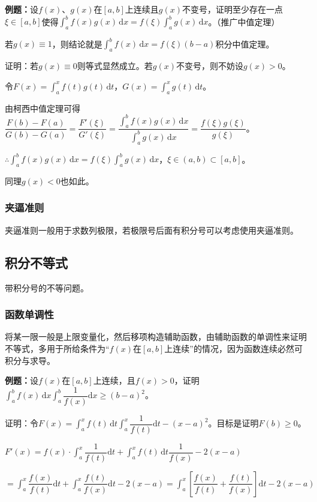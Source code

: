 \documentclass[UTF8, 12pt]{ctexart}
\begin{document}
\textbf{例题：}设$f(x)$、$g(x)$在$[a,b]$上连续且$g(x)$不变号，证明至少存在一点$\xi\in[a,b]$使得$\int_a^bf(x)g(x)\,\textrm{d}x=f(\xi)\int_a^bg(x)\,\textrm{d}x$。（推广中值定理）

若$g(x)\equiv1$，则结论就是$\int_a^bf(x)\,\textrm{d}x=f(\xi)(b-a)$积分中值定理。

证明：若$g(x)\equiv0$则等式显然成立。若$g(x)$不变号，则不妨设$g(x)>0$。

令$F(x)=\int_a^xf(t)g(t)\,\textrm{d}t$，$G(x)=\int_a^xg(t)\,\textrm{d}t$。

由柯西中值定理可得$\dfrac{F(b)-F(a)}{G(b)-G(a)}=\dfrac{F'(\xi)}{G'(\xi)}=\dfrac{\int_a^bf(x)g(x)\,\textrm{d}x}{\int_a^bg(x)\,\textrm{d}x}=\dfrac{f(\xi)g(\xi)}{g(\xi)}$。

$\therefore\int_a^bf(x)g(x)\,\textrm{d}x=f(\xi)\int_a^bg(x)\,\textrm{d}x$，$\xi\in(a,b)\subset[a,b]$。

同理$g(x)<0$也如此。

\subsubsection{夹逼准则}

夹逼准则一般用于求数列极限，若极限号后面有积分号可以考虑使用夹逼准则。

\subsection{积分不等式}

带积分号的不等问题。

\subsubsection{函数单调性}

将某一限一般是上限变量化，然后移项构造辅助函数，由辅助函数的单调性来证明不等式，多用于所给条件为“$f(x)$在$[a,b]$上连续”的情况，因为函数连续必然可积分与求导。

\textbf{例题：}设$f(x)$在$[a,b]$上连续，且$f(x)>0$，证明$\displaystyle{\int_a^bf(x)\,\textrm{d}x\int_a^b\dfrac{1}{f(x)}\textrm{d}x}\geqslant(b-a)^2$。

证明：令$F(x)=\displaystyle{\int_a^xf(t)\,\textrm{d}t\int_a^x\dfrac{1}{f(t)}\textrm{d}t-(x-a)^2}$。目标是证明$F(b)\geqslant0$。

$F'(x)=f(x)\cdot\displaystyle{\int_a^x\dfrac{1}{f(t)}\textrm{d}t+\int_a^xf(t)\,\textrm{d}t\dfrac{1}{f(x)}}-2(x-a)$

$=\displaystyle{\int_a^x\dfrac{f(x)}{f(t)}\textrm{d}t+\int_a^x\dfrac{f(t)}{f(x)}\textrm{d}t-2(x-a)=\int_a^x\left[\dfrac{f(x)}{f(t)}+\dfrac{f(t)}{f(x)}\right]\textrm{d}t-2(x-a)}$
\end{document}
